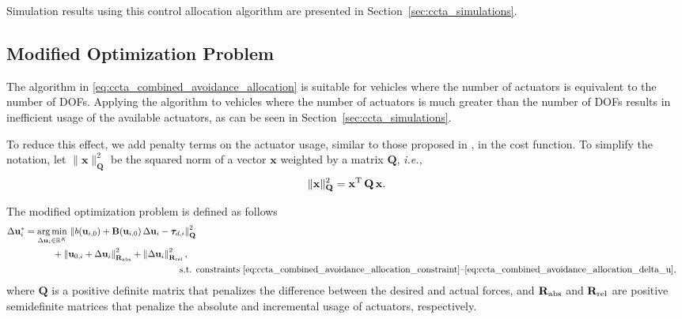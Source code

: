 Simulation results using this control allocation algorithm are presented in Section~\ref{sec:ccta_simulations}.

\subsection{Modified Optimization Problem}
The algorithm in \eqref{eq:ccta_combined_avoidance_allocation} is suitable for vehicles where the number of actuators is equivalent to the number of DOFs.
Applying the algorithm to vehicles where the number of actuators is much greater than the number of DOFs results in inefficient usage of the available actuators, as can be seen in Section~\ref{sec:ccta_simulations}.

To reduce this effect, we add penalty terms on the actuator usage, similar to those proposed in \cite{johansen_constrained_2004}, in the cost function.
To simplify the notation, let $\|\mathbf{x}\|_{\mathbf{Q}}^2$ be the squared norm of a vector $\mathbf{x}$ weighted by a matrix $\mathbf{Q}$, \emph{i.e.,}
\begin{equation}
    \|\mathbf{x}\|_{\mathbf{Q}}^2 = \mathbf{x}^{\rm T}\,\mathbf{Q}\,\mathbf{x}.
\end{equation}

The modified optimization problem is defined as follows
\begin{subequations}
    \begin{align}
    \begin{split}
        \Delta\mathbf{u}_{i}^* &= \operatorname*{arg\,min}_{\Delta\mathbf{u}_{i}\in\mathbb{R}^{K}}\,\left\| b(\mathbf{u}_{i,0}) + \mathbf{B}(\mathbf{u}_{i,0})\,\Delta\mathbf{u}_{i} - \bm{\tau}_{d,i} \right\|_{\mathbf{Q}}^2 \\
        &\quad \quad \quad + \left\| \mathbf{u}_{0,i} + \Delta\mathbf{u}_{i} \right\|_{\mathbf{R}_{\rm abs}}^2 + \left\|\Delta\mathbf{u}_{i}\right\|_{\mathbf{R}_{\rm rel}}^2,
    \end{split} \\    
    \text{s.t. }&\text{constraints \eqref{eq:ccta_combined_avoidance_allocation_constraint}--\eqref{eq:ccta_combined_avoidance_allocation_delta_u},}
    \end{align}
    \label{eq:ccta_combined_avoidance_allocation_modified}
\end{subequations}
\noindent where $\mathbf{Q}$ is a positive definite matrix that penalizes the difference between the desired and actual forces, and $\mathbf{R}_{\rm abs}$ and $\mathbf{R}_{\rm rel}$ are positive semidefinite matrices that penalize the absolute and incremental usage of actuators, respectively.

